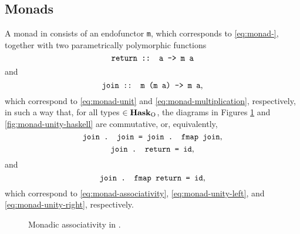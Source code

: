 \subsection*{Monads}

A monad in \hask consists of an endofunctor \texttt{m}, which
corresponds to \eqref{eq:monad-}, together with two parametrically
polymorphic functions
\begin{equation}
  \label{eq:monad-return-haskell}
  \text{\texttt{return :: a -> m a}}
\end{equation}
and
\begin{equation}
  \label{eq:monad-join-haskell}
  \text{\texttt{join :: m (m a) -> m a}}
  \text{,}
\end{equation}
which correspond to \eqref{eq:monad-unit} and
\eqref{eq:monad-multiplication}, respectively, in such a way that, for
all types  $\in \mathcal{\mathbf{Hask}}_{\operatorname{O}}$, the diagrams in Figures
\ref{fig:monad-associativity-haskell} and
\ref{fig:monad-unity-haskell} are commutative, or, equivalently,
\begin{equation}
  \label{eq:monad-associativity-haskell}
  \text{\texttt{join . join = join . fmap join}}
  \text{,}
\end{equation}
\begin{equation}
  \label{eq:monad-unity-left-haskell}
  \text{\texttt{join . return = id}}
  \text{,}
\end{equation}
and
\begin{equation}
  \label{eq:monad-unity-right-haskell}
  \text{\texttt{join . fmap return = id}}
  \text{,}
\end{equation}
which correspond to \eqref{eq:monad-associativity},
\eqref{eq:monad-unity-left}, and \eqref{eq:monad-unity-right},
respectively.
\begin{figure}[htb]
  \begin{center}
  \end{center}
  \caption{Monadic associativity in \hask.}
  \label{fig:monad-associativity-haskell}
\end{figure}
